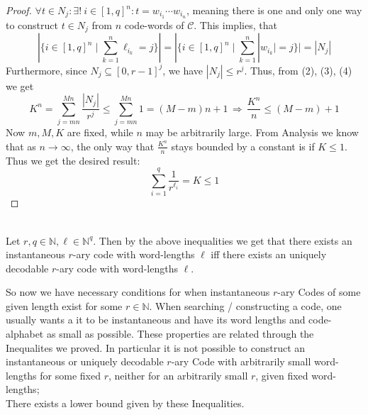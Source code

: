 \documentclass[12pt]{article}
\newenvironment{statement2}[2]{\begin{trivlist}
\item[\hskip \labelsep {\bfseries #1}\hskip \labelsep {\bfseries #2}]}{\end{trivlist}}
\newenvironment{statement3}[3]{\begin{trivlist}
\item[\hskip \labelsep {\bfseries #1}\hskip \labelsep {\bfseries #2} {#3}\textbf{.}]}{\end{trivlist}}
\begin{document}
\begin{statement3}{(1.8)}{Theorem}{(McMillan's Inequality)}
\begin{proof}
        $
            \forall t \in N_{j}: \exists!\ i \in [1,q]^n: t = w_{i_1}\cdots w_{i_n}
        $,
        meaning there is one and only one way to construct $t \in N_{j}$ from $n$ code-words of $\mathcal{C}$.
        This implies, that
        \begin{equation}
            |\{i \in [1,q]^n \mid \sum_{k=1}^{n} \ell_{i_k} = j\}|
            = |\{i \in [1,q]^n \mid \sum_{k=1}^{n} |w_{i_k}| = j\}| \tag{4}
            = |N_{j}|
        \end{equation}
        Furthermore, since $N_{j} \subseteq [0,r-1]^j$, we have $|N_{j}| \leq r^j$. Thus, from (2), (3), (4) we get
        $$
            K^n = \sum_{j = mn}^{Mn} \frac{|N_{j}|}{r^j} \leq \sum_{j = mn}^{Mn} 1 = (M-m)n + 1
            \,\Longrightarrow\, \frac{K^n}{n} \leq (M-m) + 1
        $$
        Now $m,M,K$ are fixed, while $n$ may be arbitrarily large. From Analysis we know
        that as $n \to \infty$, the only way that $\frac{K^n}{n}$ stays bounded by a constant is if $K \leq 1$.
        Thus we get the desired result:
        $$
            \sum_{i=1}^{q} \frac{1}{r^{\ell_i}} = K \leq 1
        $$
    \end{proof}
\end{statement3}

\begin{statement2}{(1.9)}{Corollary.}\strut\\[2pt]
    Let $r,q \in \mathbb{N}, \ell \in \mathbb{N}^q$. Then by the above inequalities we get
    that there exists an instantaneous $r$-ary code with word-lengths $\ell$ iff
    there exists an uniquely decodable $r$-ary code with word-lengths $\ell$.\\
\end{statement2}

So now we have necessary conditions for when instantaneous $r$-ary Codes of some
given length exist for some $r \in \mathbb{N}$.
When searching / constructing a code, one usually wants a it to be instantaneous and have
its word lengths and code-alphabet as small as possible.
These properties are related through the Inequalites we proved.
In particular it is not possible to construct an instantaneous or uniquely decodable $r$-ary Code
with arbitrarily small word-lengths for some fixed $r$, neither for an arbitrarily small
$r$, given fixed word-lengths;\\
There exists a lower bound given by these Inequalities.
\end{document}
